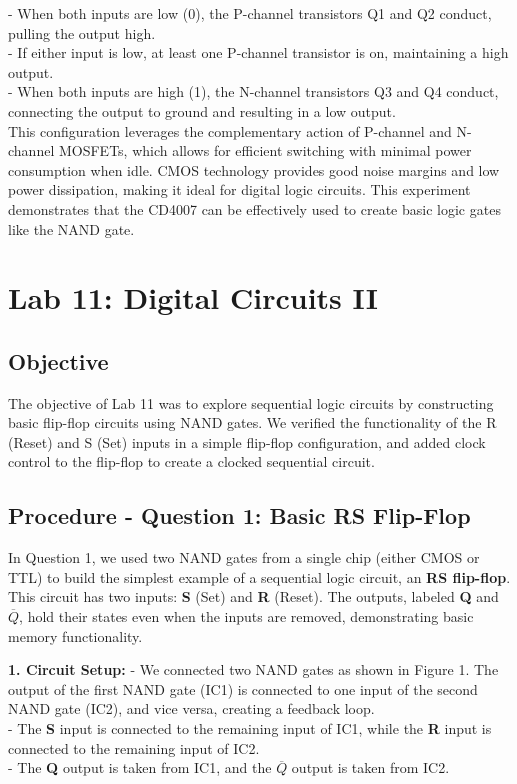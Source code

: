 \documentclass{article}
\begin{document}
       - When both inputs are low (0), the P-channel transistors Q1 and Q2 conduct, pulling the output high.
       \\
       - If either input is low, at least one P-channel transistor is on, maintaining a high output.
       \\
       - When both inputs are high (1), the N-channel transistors Q3 and Q4 conduct, connecting the output to ground and resulting in a low output.
       \\
    
    This configuration leverages the complementary action of P-channel and N-channel MOSFETs, which allows for efficient switching with minimal power consumption when idle. CMOS technology provides good noise margins and low power dissipation, making it ideal for digital logic circuits. This experiment demonstrates that the CD4007 can be effectively used to create basic logic gates like the NAND gate.




\section*{Lab 11: Digital Circuits II}

    \subsection*{Objective}
    The objective of Lab 11 was to explore sequential logic circuits by constructing basic flip-flop circuits using NAND gates. We verified the functionality of the R (Reset) and S (Set) inputs in a simple flip-flop configuration, and added clock control to the flip-flop to create a clocked sequential circuit.

    \subsection*{\textbf{Procedure - Question 1: Basic RS Flip-Flop}}
    In Question 1, we used two NAND gates from a single chip (either CMOS or TTL) to build the simplest example of a sequential logic circuit, an \textbf{RS flip-flop}. This circuit has two inputs: \textbf{S} (Set) and \textbf{R} (Reset). The outputs, labeled \textbf{Q} and \textbf{\(\overline{Q}\)}, hold their states even when the inputs are removed, demonstrating basic memory functionality.

    \textbf{1. Circuit Setup:}
    - We connected two NAND gates as shown in Figure 1. The output of the first NAND gate (IC1) is connected to one input of the second NAND gate (IC2), and vice versa, creating a feedback loop.
    \\
    - The \textbf{S} input is connected to the remaining input of IC1, while the \textbf{R} input is connected to the remaining input of IC2.
    \\
    - The \textbf{Q} output is taken from IC1, and the \textbf{\(\overline{Q}\)} output is taken from IC2.
    \\
\end{document}
